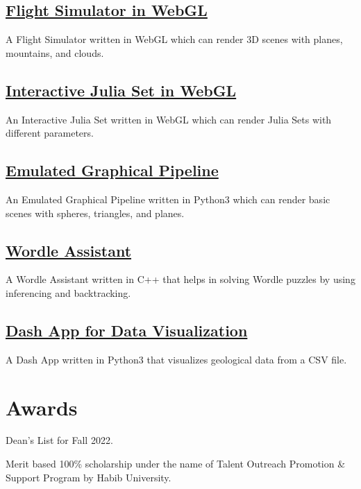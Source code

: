 \documentclass[]{resume}
\begin{document}
\begin{minipage}[t]{0.5\textwidth}
    \subsection{\href{https://github.com/Qazalbash/Flight-Simulator-in-WebGL}{\textbf{Flight Simulator in WebGL}}}
    A Flight Simulator written in WebGL which can render 3D scenes with planes, mountains, and clouds.

    \subsection{\href{https://github.com/Qazalbash/Interactive-Julia-Set}{\textbf{Interactive Julia Set in WebGL}}}
    An Interactive Julia Set written in WebGL which can render Julia Sets with different parameters.

    \subsection{\href{https://github.com/Qazalbash/Emulated-Graphical-Pipeline}{
            \textbf{Emulated Graphical Pipeline}}}%
    An Emulated Graphical Pipeline written in Python3 which can render basic scenes with spheres, triangles, and planes.

    \subsection{\href{https://github.com/Qazalbash/Wordle-Assistant}{\textbf{Wordle Assistant}}}%
    A Wordle Assistant written in C++ that helps in solving Wordle puzzles by using inferencing and backtracking.

    \subsection{\href{https://github.com/Qazalbash/Dash-App-for-Data-Visualization}{
            \textbf{Dash App for Data Visualization}}}%
    A Dash App written in Python3 that visualizes geological data from a CSV file.

    \section{Awards}
    \sectionsep
    \begin{tightemize}
        \item Dean's List for Fall 2022.
        \item Merit based 100\% scholarship under the name of Talent Outreach Promotion \& Support Program by Habib University.
    \end{tightemize}


\end{minipage}
\end{document}
